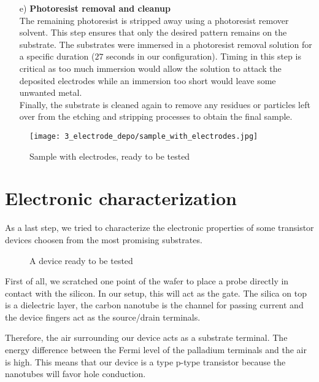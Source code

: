 \documentclass[a4paper,12pt,twoside]{article}
\begin{document}
\begin{enumerate}
    \item[e)] \textbf{Photoresist removal and cleanup} \\
    The remaining photoresist is stripped away using a photoresist remover solvent. This step ensures that only the desired pattern remains on the substrate. The substrates were immersed in a photoresist removal solution for a specific duration ($27$ seconds in our configuration). Timing in this step is critical as too much immersion would allow the solution to attack the deposited electrodes while an immersion too short would leave some unwanted metal.
    \\
    Finally, the substrate is cleaned again to remove any residues or particles left over from the etching and stripping processes to obtain the final sample.
\end{enumerate}

\begin{figure}[h]
    \centering
    \texttt{[image: 3\_electrode\_depo/sample\_with\_electrodes.jpg]}
    \caption{Sample with electrodes, ready to be tested}
    \label{fig:sample-final}
\end{figure}

\newpage
\label{sec:elec_charact}
\section{Electronic characterization}
As a last step, we tried to characterize the electronic properties of some transistor devices choosen from the most promising substrates.

\begin{figure}[h]
    \centering
    \caption{A device ready to be tested}
\end{figure}

First of all, we scratched one point of the wafer to place a probe directly in contact with the silicon. In our setup, this will act as the gate. The silica on top is a dielectric layer, the carbon nanotube is the channel for passing current and the device fingers act as the source/drain terminals.

Therefore, the air surrounding our device acts as a substrate terminal. The energy difference between the Fermi level of the palladium terminals and the air is high. This means that our device is a type p-type transistor because the nanotubes will favor hole conduction.
\end{document}

